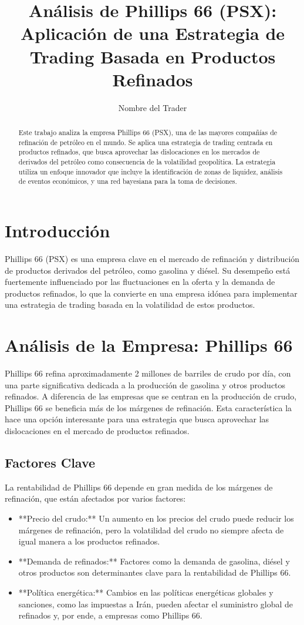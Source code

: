 \documentclass[12pt]{article}
\title{Análisis de Phillips 66 (PSX): Aplicación de una Estrategia de Trading Basada en Productos Refinados}
\author{Nombre del Trader}
\begin{document}
\maketitle

\begin{abstract}
Este trabajo analiza la empresa Phillips 66 (PSX), una de las mayores compañías de refinación de petróleo en el mundo. Se aplica una estrategia de trading centrada en productos refinados, que busca aprovechar las dislocaciones en los mercados de derivados del petróleo como consecuencia de la volatilidad geopolítica. La estrategia utiliza un enfoque innovador que incluye la identificación de zonas de liquidez, análisis de eventos económicos, y una red bayesiana para la toma de decisiones.
\end{abstract}

\section{Introducción}
Phillips 66 (PSX) es una empresa clave en el mercado de refinación y distribución de productos derivados del petróleo, como gasolina y diésel. Su desempeño está fuertemente influenciado por las fluctuaciones en la oferta y la demanda de productos refinados, lo que la convierte en una empresa idónea para implementar una estrategia de trading basada en la volatilidad de estos productos.

\section{Análisis de la Empresa: Phillips 66}
Phillips 66 refina aproximadamente 2 millones de barriles de crudo por día, con una parte significativa dedicada a la producción de gasolina y otros productos refinados. A diferencia de las empresas que se centran en la producción de crudo, Phillips 66 se beneficia más de los márgenes de refinación. Esta característica la hace una opción interesante para una estrategia que busca aprovechar las dislocaciones en el mercado de productos refinados.

\subsection{Factores Clave}
La rentabilidad de Phillips 66 depende en gran medida de los márgenes de refinación, que están afectados por varios factores:
\begin{itemize}
    \item **Precio del crudo:** Un aumento en los precios del crudo puede reducir los márgenes de refinación, pero la volatilidad del crudo no siempre afecta de igual manera a los productos refinados.
    \item **Demanda de refinados:** Factores como la demanda de gasolina, diésel y otros productos son determinantes clave para la rentabilidad de Phillips 66.
    \item **Política energética:** Cambios en las políticas energéticas globales y sanciones, como las impuestas a Irán, pueden afectar el suministro global de refinados y, por ende, a empresas como Phillips 66.
\end{itemize}
\end{document}
